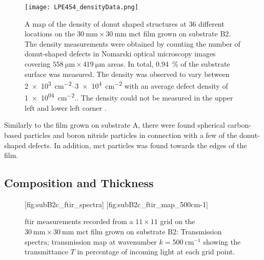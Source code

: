 
\begin{figure}[htbp]
    \centering
    \texttt{[image: LPE454\_densityData.png]}
    \caption[Map of the density of donut shaped structures on the \ac{mct} film grown on substrate B2.]{A map of the density of donut shaped structures at 36 different locations on the $\SI{30}{\milli\metre}\times\SI{30}{\milli\metre}$ \ac{mct} film grown on substrate B2. The density measurements were obtained by counting the number of donut-shaped defects in Nomarski optical microscopy images covering $\SI{558}{\micro\metre}\times\SI{419}{\micro\metre}$ areas. In total, \SI{0.94}{\percent} of the substrate surface was measured. The density was observed to vary between \SIrange{2e+3}{3e+4}{\centi\metre^{-2}} with an average defect density of \SI{1e+04}{\centi\metre^{-2}}.. The density could not be measured in the upper left and lower left corner .}
    \label{fig:LPE454_densityData}
\end{figure}

Similarly to the film grown on substrate A, there were found spherical carbon-based particles and boron nitride particles in connection with a few of the donut-shaped defects. In addition, \ac{mct} particles was found towards the edges of the film.

\subsection{Composition and Thickness}


\begin{figure}[htbp]
    \centering
    [fig:subB2c_ftir_spectra]
    \hfill
    [fig:subB2c_ftir_map_500cm-1]
    \caption[\Ac{ftir} measurements of the \ac{mct} film grown on substrate B2.]{\Ac{ftir} measurements recorded from a $11\times11$ grid on the $\SI{30}{\milli\metre}\times\SI{30}{\milli\metre}$ \ac{mct} film grown on substrate B2:  Transmission spectra;  transmission map at wavenumber $k=\SI{500}{\centi\metre^{-1}}$ showing the transmittance $T$ in percentage of incoming light at each grid point.}
\end{figure}

